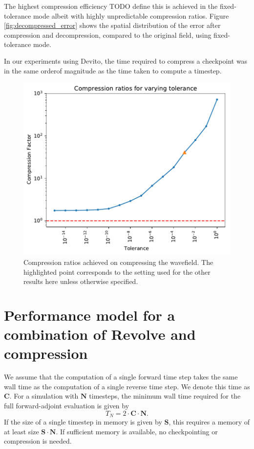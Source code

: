 \documentclass[conference]{IEEEtran}
\begin{document}
The highest compression efficiency TODO define this is achieved in the
fixed-tolerance mode albeit with highly unpredictable compression ratios. Figure
\ref{fig:decompressed_error} shows the spatial distribution of the error after
compression and decompression, compared to the original field, using
fixed-tolerance mode.

In our experiments using Devito, the time required to compress a checkpoint was
in the same orderof magnitude as the time taken to compute a timestep.

\begin{figure}
\begin{center}
\includegraphics[width=0.8\linewidth]{images/tolerance-cf-richter.pdf}
\end{center}
\caption{Compression ratios achieved on compressing the wavefield. The
highlighted point corresponds to the setting used for the other results here
unless otherwise specified.}
\label{fig:tolerance_cf_plot}
\end{figure}

\section{Performance model for a combination of Revolve and compression}
\label{sec:performance_model}
We assume that the computation of a single forward time step takes the same wall
time as the computation of a single reverse time step. We denote this time as
$\mathbf{C}$. For a simulation with $\mathbf{N}$ timesteps, the minimum wall time required
for the full forward-adjoint evaluation is given by
\begin{equation}
T_N = 2 \cdot \mathbf{C} \cdot \mathbf{N}.
\end{equation}
If the size of a single timestep in memory is given by $\mathbf{S}$, this
requires a memory of at least size $\mathbf{S} \cdot \mathbf{N}$. If sufficient memory
is available, no checkpointing or compression is needed.
\end{document}

